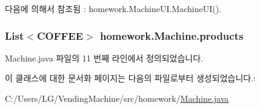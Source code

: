 다음에 의해서 참조됨 \+:  homework.\+Machine\+U\+I.\+Machine\+U\+I().

\subsubsection[{\texorpdfstring{products}{products}}]{\setlength{\rightskip}{0pt plus 5cm}List$<${\bf C\+O\+F\+F\+EE}$>$ homework.\+Machine.\+products\hspace{0.3cm}{\ttfamily [private]}}\hypertarget{classhomework_1_1_machine_aa7e2e4b22adbae6508949a4c9b7f8994}{}\label{classhomework_1_1_machine_aa7e2e4b22adbae6508949a4c9b7f8994}


Machine.\+java 파일의 11 번째 라인에서 정의되었습니다.



이 클래스에 대한 문서화 페이지는 다음의 파일로부터 생성되었습니다.\+:\begin{DoxyCompactItemize}
\item 
C\+:/\+Users/\+L\+G/\+Vending\+Machine/src/homework/\hyperlink{_machine_8java}{Machine.\+java}\end{DoxyCompactItemize}
